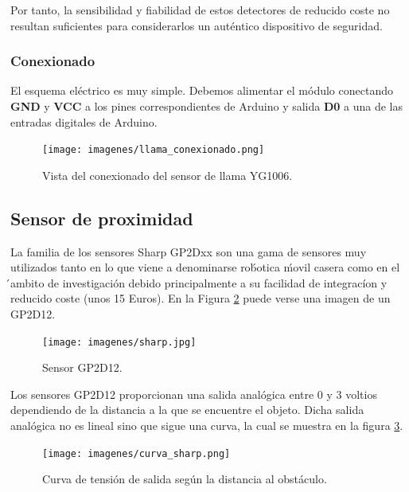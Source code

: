 Por tanto, la sensibilidad y fiabilidad de estos detectores de reducido coste no resultan suficientes para considerarlos un auténtico dispositivo de seguridad.\\
 
\subsubsection{Conexionado}

El esquema eléctrico es muy simple. Debemos alimentar el módulo conectando \textbf{GND} y \textbf{VCC} a los pines correspondientes de Arduino y salida \textbf{D0} a una de las 
entradas digitales de Arduino.\\

 \begin{figure}[H]
  \begin{center}
    \texttt{[image: imagenes/llama\_conexionado.png]}
  \end{center}
  \caption{Vista del conexionado del sensor de llama YG1006.}
  \label{figura:sensor_mq_2_potenciometro}
\end{figure}

\subsection{Sensor de proximidad}

La familia de los sensores Sharp GP2Dxx son una gama de sensores muy utilizados tanto en lo que viene a denominarse rob́otica ḿovil casera como en el ́ambito de investigación debido
principalmente a su facilidad de integracíon y reducido coste (unos 15  Euros). En la Figura \ref{figura:sensor_sharp} puede verse una imagen de un GP2D12.\\

 \begin{figure}[H]
  \begin{center}
    \texttt{[image: imagenes/sharp.jpg]}
  \end{center}
  \caption{Sensor GP2D12.}
  \label{figura:sensor_sharp}
\end{figure}

Los sensores GP2D12 proporcionan una salida analógica entre 0 y 3 voltios dependiendo de la distancia a la que se encuentre el objeto. Dicha salida analógica no es
lineal sino que sigue una curva, la cual se muestra en la figura \ref{figura:curva_sharp}.

 \begin{figure}[H]
  \begin{center}
    \texttt{[image: imagenes/curva\_sharp.png]}
  \end{center}
  \caption{Curva de tensión de salida según la distancia al obstáculo.}
  \label{figura:curva_sharp}
\end{figure}

